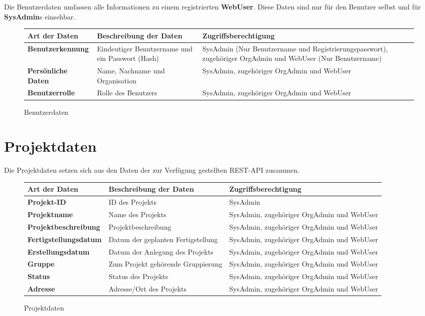 Die Benutzerdaten umfassen alle Informationen zu einem registrierten \textbf{WebUser}. Diese Daten sind nur f\"ur den Benutzer selbst und f\"ur \textbf{SysAdmin}s einsehbar.

\begin{figure}[h]
	\centering
	\begin{tabularx}{\textwidth}{| X || X | X |}
        \hline
		\textbf{Art der Daten} & \textbf{Beschreibung der Daten} & \textbf{Zugriffsberechtigung} \\ \hline \hline
		\textbf{Benutzerkennung} & Eindeutiger Benutzername und ein Passwort (Hash) & SysAdmin (Nur Benutzername und Registrierungspasswort), zugehöriger OrgAdmin und WebUser (Nur Benutzername) \\ \hline
		\textbf{Persönliche Daten} & Name, Nachname und Organisation & SysAdmin, zugehöriger OrgAdmin und WebUser \\ \hline
		\textbf{Benutzerrolle} & Rolle des Benutzers & SysAdmin, zugehöriger OrgAdmin und WebUser \\ \hline
	\end{tabularx}
	\caption{Benutzerdaten}
	\label{fig:Benutzerdaten}
\end{figure}

\newpage

\section{Projektdaten}

Die Projektdaten setzen sich aus den Daten der zur Verf\"ugung gestellten REST-API zusammen.

\begin{figure}[h]
	\centering
	\begin{tabularx}{\textwidth}{| X || X | X |}
        \hline
		\textbf{Art der Daten} & \textbf{Beschreibung der Daten} & \textbf{Zugriffsberechtigung} \\ \hline \hline
        \textbf{Projekt-ID} & ID des Projekts & SysAdmin \\ \hline
		\textbf{Projektname} & Name des Projekts & SysAdmin, zugehöriger OrgAdmin und WebUser \\ \hline
		\textbf{Projektbeschreibung} & Projektbeschreibung & SysAdmin, zugehöriger OrgAdmin und WebUser \\ \hline
		\textbf{Fertigstellungsdatum} & Datum der geplanten Fertigstellung & SysAdmin, zugehöriger OrgAdmin und WebUser \\ \hline
        \textbf{Erstellungsdatum} & Datum der Anlegung des Projekts & SysAdmin, zugehöriger OrgAdmin und WebUser \\ \hline
        \textbf{Gruppe} & Zum Projekt gehörende Gruppierung & SysAdmin, zugehöriger OrgAdmin und WebUser \\ \hline
        \textbf{Status} & Status des Projekts & SysAdmin, zugehöriger OrgAdmin und WebUser \\ \hline
        \textbf{Adresse} & Adresse/Ort des Projekts & SysAdmin, zugehöriger OrgAdmin und WebUser \\ \hline
	\end{tabularx}
	\caption{Projektdaten}
	\label{fig:Projektdaten}
\end{figure}

